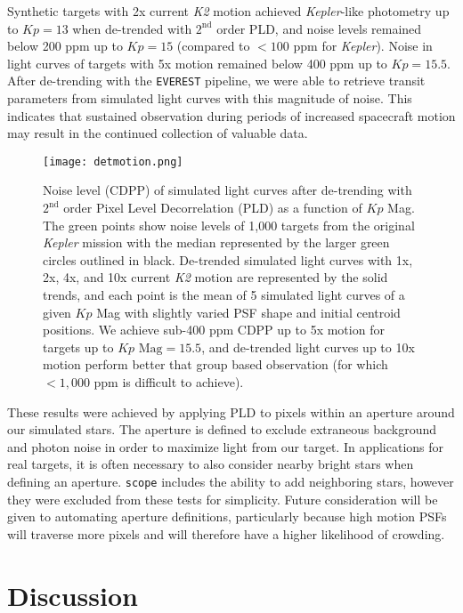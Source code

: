 \documentclass[12pt,preprint]{aastex}
\begin{document}
Synthetic targets with 2x current \textit{K2} motion achieved \textit{Kepler}-like photometry up to $Kp = 13$ when de-trended with $2^{\text{nd}}$ order PLD, and noise levels remained below 200 ppm up to $Kp = 15$ (compared to $<100$ ppm for \textit{Kepler}). Noise in light curves of targets with 5x motion remained below 400 ppm up to $Kp = 15.5$. After de-trending with the \texttt{EVEREST} pipeline, we were able to retrieve transit parameters from simulated light curves with this magnitude of noise. This indicates that sustained observation during periods of increased spacecraft motion may result in the continued collection of valuable data.

\begin{figure}[h]
	\centering
	\texttt{[image: detmotion.png]}
	\caption{Noise level (CDPP) of simulated light curves after de-trending with $2^{\text{nd}}$ order Pixel Level Decorrelation (PLD) as a function of $Kp$ Mag. The green points show noise levels of 1,000 targets from the original \textit{Kepler} mission with the median represented by the larger green circles outlined in black. De-trended simulated light curves with 1x, 2x, 4x, and 10x current \textit{K2} motion are represented by the solid trends, and each point is the mean of 5 simulated light curves of a given $Kp$ Mag with slightly varied PSF shape and initial centroid positions. We achieve sub-400 ppm CDPP up to 5x motion for targets up to $Kp \text{ Mag}=15.5$, and de-trended light curves up to 10x motion perform better that group based observation (for which $<1,000$ ppm is difficult to achieve).}
	\label{fig:detmotion}
\end{figure}

These results were achieved by applying PLD to pixels within an aperture around our simulated stars. The aperture is defined to exclude extraneous background and photon noise in order to maximize light from our target. In applications for real targets, it is often necessary to also consider nearby bright stars when defining an aperture. \texttt{scope} includes the ability to add neighboring stars, however they were excluded from these tests for simplicity. Future consideration will be given to automating aperture definitions, particularly because high motion PSFs will traverse more pixels and will therefore have a higher likelihood of crowding.

\section{Discussion}
\end{document}
